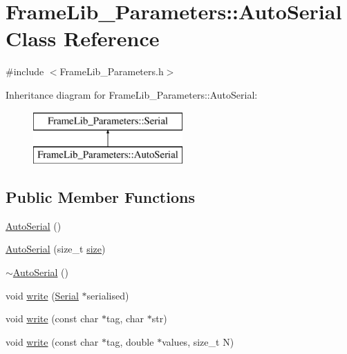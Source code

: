 \hypertarget{class_frame_lib___parameters_1_1_auto_serial}{}\section{Frame\+Lib\+\_\+\+Parameters\+:\+:Auto\+Serial Class Reference}
\label{class_frame_lib___parameters_1_1_auto_serial}


{\ttfamily \#include $<$Frame\+Lib\+\_\+\+Parameters.\+h$>$}

Inheritance diagram for Frame\+Lib\+\_\+\+Parameters\+:\+:Auto\+Serial\+:\begin{figure}[H]
\begin{center}
\leavevmode
\includegraphics[height=2.000000cm]{class_frame_lib___parameters_1_1_auto_serial}
\end{center}
\end{figure}
\subsection*{Public Member Functions}
\begin{DoxyCompactItemize}
\item 
\hyperlink{class_frame_lib___parameters_1_1_auto_serial_a633ec0dfc1b5a1bdf67b0932e2c132d4}{Auto\+Serial} ()
\item 
\hyperlink{class_frame_lib___parameters_1_1_auto_serial_ade5aeae38060ad0e691517d3d6bc3600}{Auto\+Serial} (size\+\_\+t \hyperlink{class_frame_lib___parameters_1_1_serial_a04ad46904d9fd8119283eae663901886}{size})
\item 
\hyperlink{class_frame_lib___parameters_1_1_auto_serial_a8332e640a34eca6f4c39dc0bd135fdab}{$\sim$\+Auto\+Serial} ()
\item 
void \hyperlink{class_frame_lib___parameters_1_1_auto_serial_a23c1eded5d1a25f81a6bda199ab522f0}{write} (\hyperlink{class_frame_lib___parameters_1_1_serial}{Serial} $\ast$serialised)
\item 
void \hyperlink{class_frame_lib___parameters_1_1_auto_serial_a9e6caad3d1e7d6176c2cb84bbe859b58}{write} (const char $\ast$tag, char $\ast$str)
\item 
void \hyperlink{class_frame_lib___parameters_1_1_auto_serial_a3066854fc6c246174b311f3849426a36}{write} (const char $\ast$tag, double $\ast$values, size\+\_\+t N)
\end{DoxyCompactItemize}

